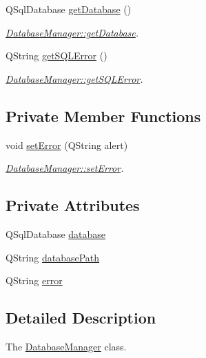 \begin{DoxyCompactItemize}
\item 
Q\+Sql\+Database \hyperlink{class_database_manager_a4c1124bbf21d49013912fedac7407ce8}{get\+Database} ()
\begin{DoxyCompactList}\small\item\em \hyperlink{class_database_manager_a4c1124bbf21d49013912fedac7407ce8}{Database\+Manager\+::get\+Database}. \end{DoxyCompactList}\item 
Q\+String \hyperlink{class_database_manager_ab3c7cbe356245a5d3222147e1bb019bd}{get\+S\+Q\+L\+Error} ()
\begin{DoxyCompactList}\small\item\em \hyperlink{class_database_manager_ab3c7cbe356245a5d3222147e1bb019bd}{Database\+Manager\+::get\+S\+Q\+L\+Error}. \end{DoxyCompactList}\end{DoxyCompactItemize}
\subsection*{Private Member Functions}
\begin{DoxyCompactItemize}
\item 
void \hyperlink{class_database_manager_a0d54fec86ec216a04a38b98ef2493b9f}{set\+Error} (Q\+String alert)
\begin{DoxyCompactList}\small\item\em \hyperlink{class_database_manager_a0d54fec86ec216a04a38b98ef2493b9f}{Database\+Manager\+::set\+Error}. \end{DoxyCompactList}\end{DoxyCompactItemize}
\subsection*{Private Attributes}
\begin{DoxyCompactItemize}
\item 
Q\+Sql\+Database \hyperlink{class_database_manager_ac59e194df96c891e617fcff06a56745b}{database}
\item 
Q\+String \hyperlink{class_database_manager_ac6e7c2d8a3d5603e83c0cd36cdb4e870}{database\+Path}
\item 
Q\+String \hyperlink{class_database_manager_aeac4d1f7e240732d413d6e7d74cbaef6}{error}
\end{DoxyCompactItemize}


\subsection{Detailed Description}
The \hyperlink{class_database_manager}{Database\+Manager} class. 

